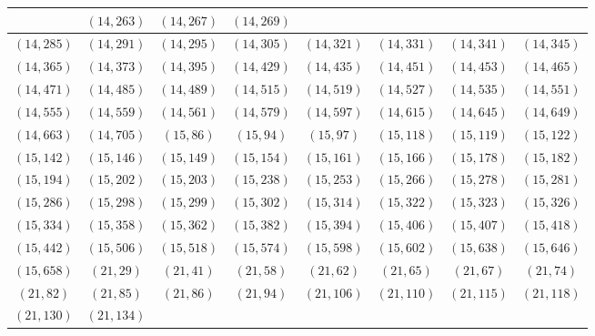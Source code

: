 \documentclass[11pt,reqno]{amsart}
\theoremstyle{definition}
\begin{document}
\begin{longtable}{|c|c|c|c|c|c|c|c|}
 & 
$ ( 14 , 263 )$
 & 
$ ( 14 , 267 )$
 & 
$ ( 14 , 269 )$
\\ \hline
$ ( 14 , 285 )$
 & 
$ ( 14 , 291 )$
 & 
$ ( 14 , 295 )$
 & 
$ ( 14 , 305 )$
 & 
$ ( 14 , 321 )$
 & 
$ ( 14 , 331 )$
 & 
$ ( 14 , 341 )$
 & 
$ ( 14 , 345 )$
\\ \hline
$ ( 14 , 365 )$
 & 
$ ( 14 , 373 )$
 & 
$ ( 14 , 395 )$
 & 
$ ( 14 , 429 )$
 & 
$ ( 14 , 435 )$
 & 
$ ( 14 , 451 )$
 & 
$ ( 14 , 453 )$
 & 
$ ( 14 , 465 )$
\\ \hline
$ ( 14 , 471 )$
 & 
$ ( 14 , 485 )$
 & 
$ ( 14 , 489 )$
 & 
$ ( 14 , 515 )$
 & 
$ ( 14 , 519 )$
 & 
$ ( 14 , 527 )$
 & 
$ ( 14 , 535 )$
 & 
$ ( 14 , 551 )$
\\ \hline
$ ( 14 , 555 )$
 & 
$ ( 14 , 559 )$
 & 
$ ( 14 , 561 )$
 & 
$ ( 14 , 579 )$
 & 
$ ( 14 , 597 )$
 & 
$ ( 14 , 615 )$
 & 
$ ( 14 , 645 )$
 & 
$ ( 14 , 649 )$
\\ \hline
$ ( 14 , 663 )$
 & 
$ ( 14 , 705 )$
 & 
$ ( 15 , 86 )$
 & 
$ ( 15 , 94 )$
 & 
$ ( 15 , 97 )$
 & 
$ ( 15 , 118 )$
 & 
$ ( 15 , 119 )$
 & 
$ ( 15 , 122 )$
\\ \hline
$ ( 15 , 142 )$
 & 
$ ( 15 , 146 )$
 & 
$ ( 15 , 149 )$
 & 
$ ( 15 , 154 )$
 & 
$ ( 15 , 161 )$
 & 
$ ( 15 , 166 )$
 & 
$ ( 15 , 178 )$
 & 
$ ( 15 , 182 )$
\\ \hline
$ ( 15 , 194 )$
 & 
$ ( 15 , 202 )$
 & 
$ ( 15 , 203 )$
 & 
$ ( 15 , 238 )$
 & 
$ ( 15 , 253 )$
 & 
$ ( 15 , 266 )$
 & 
$ ( 15 , 278 )$
 & 
$ ( 15 , 281 )$
\\ \hline
$ ( 15 , 286 )$
 & 
$ ( 15 , 298 )$
 & 
$ ( 15 , 299 )$
 & 
$ ( 15 , 302 )$
 & 
$ ( 15 , 314 )$
 & 
$ ( 15 , 322 )$
 & 
$ ( 15 , 323 )$
 & 
$ ( 15 , 326 )$
\\ \hline
$ ( 15 , 334 )$
 & 
$ ( 15 , 358 )$
 & 
$ ( 15 , 362 )$
 & 
$ ( 15 , 382 )$
 & 
$ ( 15 , 394 )$
 & 
$ ( 15 , 406 )$
 & 
$ ( 15 , 407 )$
 & 
$ ( 15 , 418 )$
\\ \hline
$ ( 15 , 442 )$
 & 
$ ( 15 , 506 )$
 & 
$ ( 15 , 518 )$
 & 
$ ( 15 , 574 )$
 & 
$ ( 15 , 598 )$
 & 
$ ( 15 , 602 )$
 & 
$ ( 15 , 638 )$
 & 
$ ( 15 , 646 )$
\\ \hline
$ ( 15 , 658 )$
 & 
$ ( 21 , 29 )$
 & 
$ ( 21 , 41 )$
 & 
$ ( 21 , 58 )$
 & 
$ ( 21 , 62 )$
 & 
$ ( 21 , 65 )$
 & 
$ ( 21 , 67 )$
 & 
$ ( 21 , 74 )$
\\ \hline
$ ( 21 , 82 )$
 & 
$ ( 21 , 85 )$
 & 
$ ( 21 , 86 )$
 & 
$ ( 21 , 94 )$
 & 
$ ( 21 , 106 )$
 & 
$ ( 21 , 110 )$
 & 
$ ( 21 , 115 )$
 & 
$ ( 21 , 118 )$
\\ \hline
$ ( 21 , 130 )$
 & 
$ ( 21 , 134 )$

\end{longtable}
\end{document}
